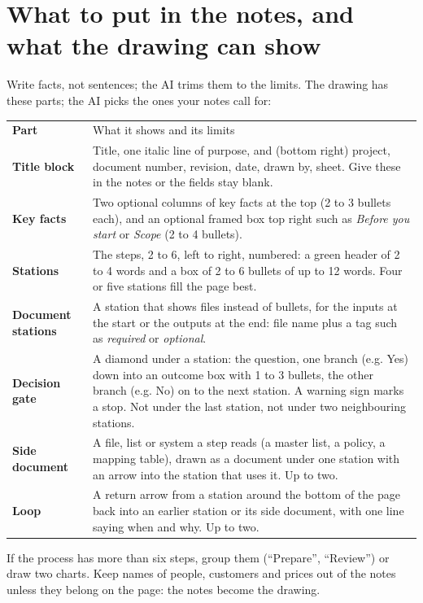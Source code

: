 \documentclass[10pt]{article}
\begin{document}
\section{What to put in the notes, and what the drawing can show}\label{sec:notes}
Write facts, not sentences; the AI trims them to the limits. The drawing has these parts; the AI picks the ones your notes call for:
\begin{center}\small
\begin{tabularx}{\linewidth}{|>{\bfseries}m{1.35in}|L|}
\hline
Part & What it shows and its limits \\
\hhline{|=|=|}
Title block & Title, one italic line of purpose, and (bottom right) project, document number, revision, date, drawn by, sheet. Give these in the notes or the fields stay blank. \\ \hline
Key facts & Two optional columns of key facts at the top (2 to 3 bullets each), and an optional framed box top right such as \emph{Before you start} or \emph{Scope} (2 to 4 bullets). \\ \hline
Stations & The steps, 2 to 6, left to right, numbered: a green header of 2 to 4 words and a box of 2 to 6 bullets of up to 12 words. Four or five stations fill the page best. \\ \hline
Document stations & A station that shows files instead of bullets, for the inputs at the start or the outputs at the end: file name plus a tag such as \emph{required} or \emph{optional}. \\ \hline
Decision gate & A diamond under a station: the question, one branch (e.g. Yes) down into an outcome box with 1 to 3 bullets, the other branch (e.g. No) on to the next station. A warning sign marks a stop. Not under the last station, not under two neighbouring stations. \\ \hline
Side document & A file, list or system a step reads (a master list, a policy, a mapping table), drawn as a document under one station with an arrow into the station that uses it. Up to two. \\ \hline
Loop & A return arrow from a station around the bottom of the page back into an earlier station or its side document, with one line saying when and why. Up to two. \\ \hline
\end{tabularx}
\end{center}
If the process has more than six steps, group them (``Prepare'', ``Review'') or draw two charts. Keep names of people, customers and prices out of the notes unless they belong on the page: the notes become the drawing.
\end{document}
